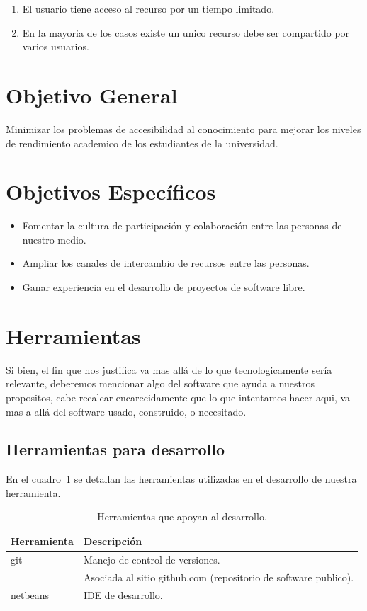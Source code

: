 \documentclass[letter,12pt]{article}
\begin{document}
\begin{enumerate}
\item El usuario tiene acceso al recurso por un tiempo limitado.
\item En la mayoria de los casos existe un unico recurso debe ser compartido por varios usuarios.
\end{enumerate} 

\section{Objetivo General}
Minimizar los problemas de accesibilidad al conocimiento para mejorar los niveles de rendimiento
academico de los estudiantes de la universidad.

\section{Objetivos Específicos}
\begin{itemize}
\item Fomentar la cultura de participación y colaboración entre las personas de nuestro medio.
\item Ampliar los canales de intercambio de recursos entre las personas.
\item Ganar experiencia en el desarrollo de proyectos de software libre.
\end{itemize}

\section{Herramientas}
Si bien, el fin que nos justifica va mas allá de lo que tecnologicamente sería relevante,
deberemos mencionar algo del software que ayuda a nuestros propositos, cabe recalcar
encarecidamente que lo que intentamos hacer aqui, va mas a allá del software usado, construido, o
necesitado.

\subsection{Herramientas para desarrollo}
En el cuadro~\ref{herramientas_desarrollo} se detallan las herramientas utilizadas en el
desarrollo de nuestra herramienta.

\begin{table}
\begin{tabular}{l|l}
Herramienta & Descripción \\
\hline
git & Manejo de control de versiones. \\
& Asociada al sitio github.com (repositorio de software publico). \\
netbeans & IDE de desarrollo. \\

\end{tabular}
\caption{Herramientas que apoyan al desarrollo.}
\label{herramientas_desarrollo}
\end{table}
\end{document}
